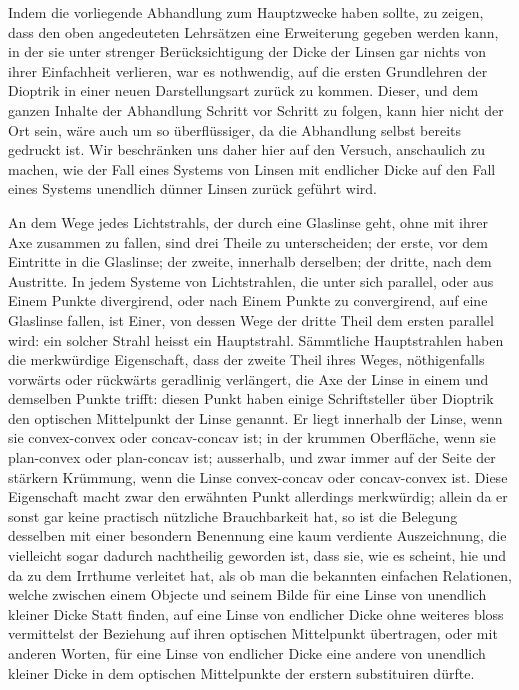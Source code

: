 Indem die vorliegende Abhandlung zum Hauptzwecke haben sollte, zu zeigen,
dass den oben angedeuteten Lehrsätzen eine Erweiterung gegeben werden kann,
in der sie unter strenger Berücksichtigung der Dicke der Linsen gar nichts von
ihrer Einfachheit verlieren, war es nothwendig, auf die ersten Grundlehren der
Dioptrik in einer neuen Darstellungsart zurück zu kommen. Dieser, und dem
ganzen Inhalte der Abhandlung Schritt vor Schritt zu folgen, kann hier nicht
der Ort sein, wäre auch um so überflüssiger, da die Abhandlung selbst bereits
gedruckt ist. Wir beschränken uns daher hier auf den Versuch, anschaulich zu
\clearpage
{}
\noindent
machen, wie der Fall eines Systems von Linsen mit endlicher Dicke auf den
Fall eines Systems unendlich dünner Linsen zurück geführt wird.

An dem Wege jedes Lichtstrahls, der durch eine Glaslinse geht, ohne mit
ihrer Axe zusammen zu fallen, sind drei Theile zu unterscheiden; der erste, vor
dem Eintritte in die Glaslinse; der zweite, innerhalb derselben; der dritte, nach
dem Austritte. In jedem Systeme von Lichtstrahlen, die unter sich parallel,
oder aus Einem Punkte divergirend, oder nach Einem Punkte zu convergirend,
auf eine Glaslinse fallen, ist Einer, von dessen Wege der dritte Theil dem
ersten parallel wird: ein solcher Strahl heisst ein Hauptstrahl. Sämmtliche
Hauptstrahlen haben die merkwürdige Eigenschaft, dass der zweite Theil ihres
Weges, nöthigenfalls vorwärts oder rückwärts geradlinig verlängert, die Axe der
Linse in einem und demselben Punkte trifft: diesen Punkt haben einige Schriftsteller
über Dioptrik den optischen Mittelpunkt der Linse genannt. Er liegt
innerhalb der Linse, wenn sie convex-convex oder concav-concav ist; in der
krummen Oberfläche, wenn sie plan-convex oder plan-concav ist; ausserhalb, und
zwar immer auf der Seite der stärkern Krümmung, wenn die Linse convex-concav
oder concav-convex ist. Diese Eigenschaft macht zwar den erwähnten Punkt
allerdings merkwürdig; allein da er sonst gar keine practisch nützliche Brauchbarkeit
hat, so ist die Belegung desselben mit einer besondern Benennung eine
kaum verdiente Auszeichnung, die vielleicht sogar dadurch nachtheilig geworden
ist, dass sie, wie es scheint, hie und da zu dem Irrthume verleitet hat, als ob
man die bekannten einfachen Relationen, welche zwischen einem Objecte und
seinem Bilde für eine Linse von unendlich kleiner Dicke Statt finden, auf eine
Linse von endlicher Dicke ohne weiteres bloss vermittelst der Beziehung auf
ihren optischen Mittelpunkt übertragen, oder mit anderen Worten, für eine Linse
von endlicher Dicke eine andere von unendlich kleiner Dicke in dem optischen
Mittelpunkte der erstern substituiren dürfte.

